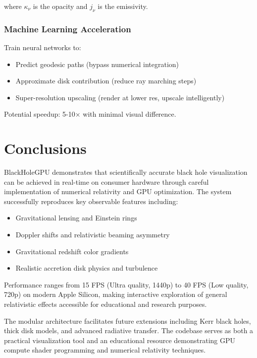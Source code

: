 \documentclass[12pt,a4paper]{article}
\theoremstyle{definition}
\theoremstyle{remark}
\begin{document}
where $\kappa_\nu$ is the opacity and $j_\nu$ is the emissivity.

\subsubsection{Machine Learning Acceleration}

Train neural networks to:
\begin{itemize}
    \item Predict geodesic paths (bypass numerical integration)
    \item Approximate disk contribution (reduce ray marching steps)
    \item Super-resolution upscaling (render at lower res, upscale intelligently)
\end{itemize}

Potential speedup: 5-10× with minimal visual difference.

\section{Conclusions}

BlackHoleGPU demonstrates that scientifically accurate black hole visualization can be achieved in real-time on consumer hardware through careful implementation of numerical relativity and GPU optimization. The system successfully reproduces key observable features including:

\begin{itemize}
    \item Gravitational lensing and Einstein rings
    \item Doppler shifts and relativistic beaming asymmetry
    \item Gravitational redshift color gradients
    \item Realistic accretion disk physics and turbulence
\end{itemize}

Performance ranges from 15 FPS (Ultra quality, 1440p) to 40 FPS (Low quality, 720p) on modern Apple Silicon, making interactive exploration of general relativistic effects accessible for educational and research purposes.

The modular architecture facilitates future extensions including Kerr black holes, thick disk models, and advanced radiative transfer. The codebase serves as both a practical visualization tool and an educational resource demonstrating GPU compute shader programming and numerical relativity techniques.
\end{document}
